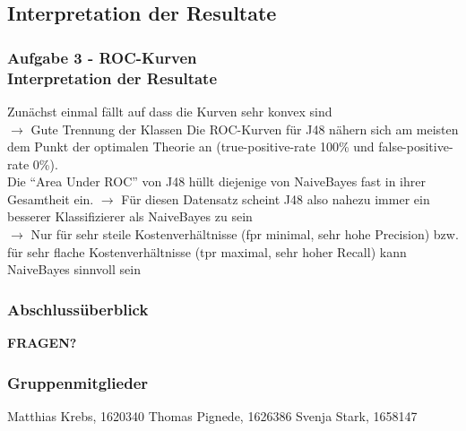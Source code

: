 \documentclass[accentcolor=tud6b,colorbacktitle,inverttitle,landscape,german,presentation,t]{tudbeamer}
\begin{document}
    \subsection{Interpretation der Resultate}
    
    \begin{frame}[t]
    \frametitle{Aufgabe 3 - ROC-Kurven\\ Interpretation der Resultate}
        Zunächst einmal fällt auf dass die Kurven sehr konvex sind\\
        $\rightarrow$ Gute Trennung der Klassen
        \vfill 
        Die ROC-Kurven für J48 nähern sich am meisten dem Punkt der optimalen Theorie an (true-positive-rate 100\% und false-positive-rate 0\%).\\
        Die ``Area Under ROC'' von J48 hüllt diejenige von NaiveBayes fast in ihrer Gesamtheit ein.
        \vfill
        $\rightarrow$ Für diesen Datensatz scheint J48 also nahezu immer ein besserer Klassifizierer als NaiveBayes zu sein\\
        $\rightarrow$ Nur für sehr steile Kostenverhältnisse (fpr minimal, sehr hohe Precision) bzw. für sehr flache Kostenverhältnisse (tpr maximal, sehr hoher Recall) kann NaiveBayes sinnvoll sein
    \end{frame}

\begin{frame}
\frametitle{Abschlussüberblick}
\tableofcontents
\begin{center}
\textbf{\Large FRAGEN?}
\end{center}
\end{frame}

\begin{frame}
\frametitle{Gruppenmitglieder}
Matthias Krebs, 1620340 \vfill
Thomas Pignede, 1626386 \vfill
Svenja Stark, 1658147
\end{frame}
\end{document}
